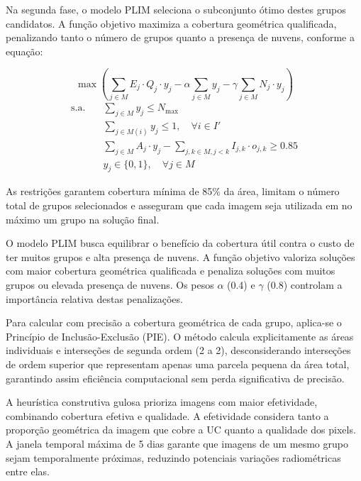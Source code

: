 \documentclass[a4paper,11pt]{article}
\begin{document}
Na segunda fase, o modelo PLIM seleciona o subconjunto ótimo destes grupos candidatos. A função objetivo maximiza a cobertura geométrica qualificada, penalizando tanto o número de grupos quanto a presença de nuvens, conforme a equação:

\begin{equation}
    \max \left( \sum_{j \in M} E_j \cdot Q_j \cdot y_j - \alpha \sum_{j \in M} y_j - \gamma \sum_{j \in M} N_j \cdot y_j \right)
\end{equation}
\vspace{-5mm}
\begin{align}
    \text{s.a.} \quad & \sum_{j \in M} y_j \leq N_{\max} \tag{2}\\
    & \sum_{j \in M(i)} y_j \leq 1, \quad \forall i \in I' \tag{3}\\
    & \sum_{j \in M} A_j \cdot y_j - \sum_{j, k \in M, j < k} I_{j,k} \cdot o_{j,k} \geq 0.85 \tag{4}\\
    & y_j \in \{0,1\}, \quad \forall j \in M \tag{5}
\end{align}

As restrições garantem cobertura mínima de 85\% da área, limitam o número total de grupos selecionados e asseguram que cada imagem seja utilizada em no máximo um grupo na solução final.

O modelo PLIM busca equilibrar o benefício da cobertura útil contra o custo de ter muitos grupos e alta presença de nuvens. A função objetivo valoriza soluções com maior cobertura geométrica qualificada e penaliza soluções com muitos grupos ou elevada presença de nuvens. Os pesos $\alpha$ (0.4) e $\gamma$ (0.8) controlam a importância relativa destas penalizações.

Para calcular com precisão a cobertura geométrica de cada grupo, aplica-se o Princípio de Inclusão-Exclusão (PIE). O método calcula explicitamente as áreas individuais e interseções de segunda ordem (2 a 2), desconsiderando interseções de ordem superior que representam apenas uma parcela pequena da área total, garantindo assim eficiência computacional sem perda significativa de precisão.

A heurística construtiva gulosa prioriza imagens com maior efetividade, combinando cobertura efetiva e qualidade. A efetividade considera tanto a proporção geométrica da imagem que cobre a UC quanto a qualidade dos pixels. A janela temporal máxima de 5 dias garante que imagens de um mesmo grupo sejam temporalmente próximas, reduzindo potenciais variações radiométricas entre elas.
\end{document}
